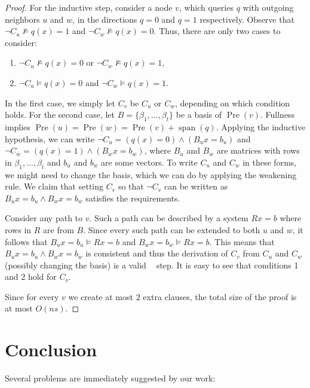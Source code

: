 \documentclass[a4paper,11pt,draft]{article}
\theoremstyle{definition}
\theoremstyle{remark}
\DeclareMathOperator{\Span}{span}
\DeclareMathOperator{\pre}{Pre}
\DeclareMathOperator{\reslin}{\mathsf{Res}[\oplus]}
\begin{document}
\begin{proof}
  For the inductive step, consider a node $v$, which queries $q$ with outgoing neighbors $u$ and $w$, in the directions $q=0$ and $q=1$ respectively. Observe that $\neg C_u \not \models q(x) = 1$ and $\neg C_w \not \models q(x) = 0$. Thus, there are only two cases to consider:
  \begin{enumerate}
    \item $\neg C_u \not \models q(x)=0$ or $\neg C_w \not \models q(x)=1$,
    \item $\neg C_u \models q(x)=0$ and $\neg C_w \models q(x)=1$.
  \end{enumerate}
  In the first case, we simply let $C_v$ be $C_u$ or $C_w$, depending on which condition holds. For the second case, let $B = \{\beta_1, \ldots, \beta_t\}$ be a basis of $\pre(v)$. Fullness implies $\pre(u) = \pre(w) = \pre(v) + \Span(q)$. Applying the inductive hypothesis, we can write $\neg C_u = (q(x)=0) \wedge (B_u x = b_u)$ and $\neg C_w = (q(x) = 1) \wedge (B_w x = b_w)$, where $B_u$ and $B_w$ are matrices with rows in $\beta_1, \ldots, \beta_t$ and $b_u$ and $b_w$ are some vectors. To write $C_u$ and $C_w$ in these forms, we might need to change the basis, which we can do by applying the weakening rule. We claim that setting $C_v$ so that $\neg C_v$ can be written as $B_u x= b_u \wedge B_w x = b_w$ satisfies the requirements.

  Consider any path to $v$. Such a path can be described by a system $Rx = b$ where rows in $R$ are from $B$. Since every such path can be extended to both $u$ and $w$, it follows that $B_u x = b_u \vDash Rx=b$ and $B_w x = b_w \vDash Rx = b$. This means that $B_u x = b_u \wedge B_w x = b_w$ is consistent and thus the derivation of $C_v$ from $C_u$ and $C_w$ (possibly changing the basis) is a valid $\reslin$ step. It is easy to see that conditions 1 and 2 hold for $C_v$.

  Since for every $v$ we create at most $2$ extra clauses, the total size of the proof is at most $O(ns)$.

 
\end{proof} 

\section{Conclusion}

Several problems are immediately suggested by our work:
\end{document}

